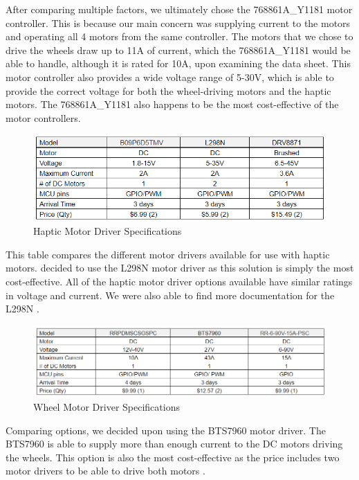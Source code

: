 \noindent After comparing multiple factors, we ultimately chose the 768861A\_Y1181 motor controller. This is because our main concern was supplying current to the motors and operating all 4 motors from the same controller. The motors that we chose to drive the wheels draw up to 11A of current, which the 768861A\_Y1181 would be able to handle, although it is rated for 10A, upon examining the data sheet. This motor controller also provides a wide voltage range of 5-30V, which is able to provide the correct voltage for both the wheel-driving motors and the haptic motors. The 768861A\_Y1181 also happens to be the most cost-effective of the motor controllers. \cite{UMLIFE} \cite{AliExpress5} \cite{Makerbase} \cite{AliExpress7} \cite{CircuitBasics} \cite{Espressif1} \cite{AliExpress4} \cite{Burgess} \cite{RandomNerd} \cite{Espressif2} \cite{SimpleFOC} \cite{SimpleFOC2} \cite{Peza}\\


\begin{figure}[H]
	\centering
	\includegraphics[width=1\textwidth]{./Images/haptic_driver_table_2.png}
	\caption{\label{fig:haptic_driver}Haptic Motor Driver Specifications}
\end{figure}

\noindent This table compares the different motor drivers available for use with haptic motors.  decided to use the L298N motor driver as this solution is simply the most cost-effective. All of the haptic motor driver options available have similar ratings in voltage and current. We were also able to find more documentation for the L298N \cite{BOJACK} \cite{BEEYDC} \cite{HiLetgo}.\\

\begin{figure}[H]
	\centering
	\includegraphics[width=1\textwidth]{./Images/wheel_driver_table.png}
	\caption{\label{fig:wheel_driver}Wheel Motor Driver Specifications}
\end{figure}

\noindent Comparing options, we decided upon using the BTS7960 motor driver. The BTS7960 is able to supply more than enough current to the DC motors driving the wheels. This option is also the most cost-effective as the price includes two motor drivers to be able to drive both motors \cite{RioRand} \cite{Gikfun} \cite{Hobbywing}.\\ 